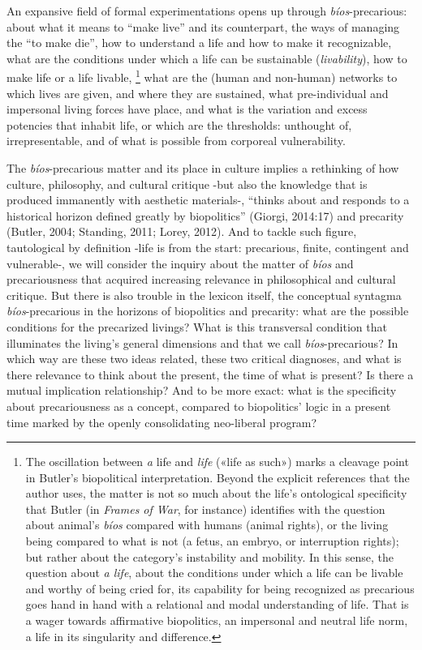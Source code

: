 \documentclass[a4paper,]{scrartcl}
\begin{document}
An expansive field of formal experimentations opens up through
\emph{bíos}-precarious: about what it means to ``make live'' and its
counterpart, the ways of managing the ``to make die'', how to understand
a life and how to make it recognizable, what are the conditions under
which a life can be sustainable (\emph{livability}), how to make life or
a life livable, \footnote{The oscillation between \emph{a} life and
  \emph{life} («life as such») marks a cleavage point in Butler's
  biopolitical interpretation. Beyond the explicit references that the
  author uses, the matter is not so much about the life's ontological
  specificity that Butler (in \emph{Frames of War}, for instance)
  identifies with the question about animal's \emph{bíos} compared with
  humans (animal rights), or the living being compared to what is not (a
  fetus, an embryo, or interruption rights); but rather about the
  category's instability and mobility. In this sense, the question about
  \emph{a life}, about the conditions under which a life can be livable
  and worthy of being cried for, its capability for being recognized as
  precarious goes hand in hand with a relational and modal understanding
  of life. That is a wager towards affirmative biopolitics, an
  impersonal and neutral life norm, a life in its singularity and
  difference.} what are the (human and non-human) networks to which
lives are given, and where they are sustained, what pre-individual and
impersonal living forces have place, and what is the variation and
excess potencies that inhabit life, or which are the thresholds:
unthought of, irrepresentable, and of what is possible from corporeal
vulnerability.

The \emph{bíos}-precarious matter and its place in culture implies a
rethinking of how culture, philosophy, and cultural critique -but also
the knowledge that is produced immanently with aesthetic materials-,
``thinks about and responds to a historical horizon defined greatly by
biopolitics'' (Giorgi, 2014:17) and precarity (Butler, 2004; Standing,
2011; Lorey, 2012). And to tackle such figure, tautological by
definition -life is from the start: precarious, finite, contingent and
vulnerable-, we will consider the inquiry about the matter of
\emph{bíos} and precariousness that acquired increasing relevance in
philosophical and cultural critique. But there is also trouble in the
lexicon itself, the conceptual syntagma \emph{bíos}-precarious in the
horizons of biopolitics and precarity: what are the possible conditions
for the precarized livings? What is this transversal condition that
illuminates the living's general dimensions and that we call
\emph{bíos}-precarious? In which way are these two ideas related, these
two critical diagnoses, and what is there relevance to think about the
present, the time of what is present? Is there a mutual implication
relationship? And to be more exact: what is the specificity about
precariousness as a concept, compared to biopolitics' logic in a present
time marked by the openly consolidating neo-liberal program?
\end{document}
